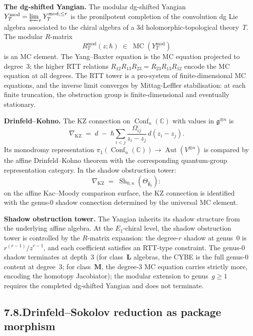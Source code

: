 \documentclass[11pt]{report}
\theoremstyle{definition}
\theoremstyle{remark}
\numberwithin{equation}{section}
\begin{document}
\medskip
\noindent\textbf{The dg-shifted Yangian.}
The modular dg-shifted Yangian
$Y_T^{\mathrm{mod}}=\varprojlim_r Y_T^{\mathrm{mod},\le r}$ is the
pronilpotent completion of the convolution dg Lie algebra associated
to the chiral algebra of a 3d holomorphic-topological theory~$T$.
The modular $R$-matrix
\[
R_T^{\mathrm{mod}}(z;\hbar)
\;\in\;
\operatorname{MC}(Y_T^{\mathrm{mod}})
\]
is an MC element. The Yang--Baxter equation is the MC equation
projected to degree~$3$; the higher RTT relations
$R_{12}R_{13}R_{23}=R_{23}R_{13}R_{12}$ encode the MC equation
at all degrees. The RTT tower is a pro-system of finite-dimensional
MC equations, and the inverse limit converges by Mittag-Leffler
stabilisation: at each finite truncation, the obstruction group is
finite-dimensional and eventually stationary.

\medskip
\noindent\textbf{Drinfeld--Kohno.}
The KZ connection on $\operatorname{Conf}_n(\mathbb C)$ with values
in $\mathfrak g^{\otimes n}$ is
\[
\nabla_{\mathrm{KZ}}
\;=\;
d\;-\;\hbar\sum_{i<j}
\frac{\Omega_{ij}}{z_i-z_j}\,d(z_i-z_j).
\]
Its monodromy representation
$\pi_1(\operatorname{Conf}_n(\mathbb C))\to
\operatorname{Aut}(V^{\otimes n})$
is compared by the affine Drinfeld--Kohno theorem with the
corresponding quantum-group representation category. In the
shadow obstruction tower:
\[
\nabla_{\mathrm{KZ}}
\;=\;
\operatorname{Sh}_{0,n}(\Theta_{\widehat{\mathfrak g}_k}):
\]
on the affine Kac--Moody comparison surface, the KZ connection is
identified with the genus-$0$ shadow connection determined by the
universal MC element.

\medskip
\noindent\textbf{Shadow obstruction tower.}
The Yangian inherits its shadow structure from the underlying affine
algebra. At the $E_1$-chiral level, the shadow obstruction tower is controlled
by the $R$-matrix expansion: the degree-$r$ shadow at genus~$0$ is
$r^{(r-1)}/z^{r-1}$, and each coefficient satisfies an RTT-type
constraint. The genus-$0$ shadow terminates at
depth~$3$ (for class~$\mathbf{L}$ algebras, the CYBE is the full genus-$0$ content at degree~$3$; for class~$\mathbf{M}$, the degree-$3$ MC equation carries strictly more, encoding the homotopy Jacobiator); the modular
extension to genus~$g\ge 1$ requires the completed dg-shifted Yangian
and does not terminate.


\subsection*{7.8.\quad Drinfeld--Sokolov reduction as package morphism}
\end{document}
